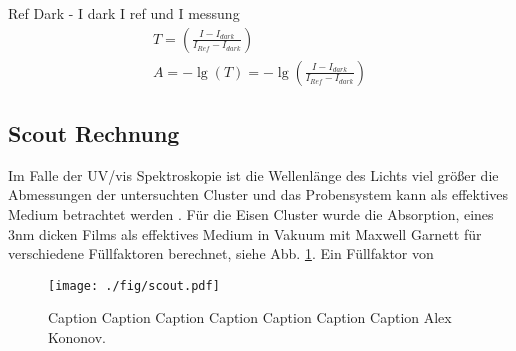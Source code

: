 Ref Dark - I dark I ref und I messung
\begin{align*}
    T=\left(\frac{I-I_{dark}}{I_{Ref}-I_{dark}}\right)\\
    A=- \lg\left(T\right) = -\lg\left(\frac{I-I_{dark}}{I_{Ref}-I_{dark}}\right)
\end{align*}

\subsection{Scout Rechnung}
\label{sec:scoutsim}
Im Falle der UV/vis Spektroskopie ist die Wellenlänge des Lichts viel größer die Abmessungen der untersuchten Cluster und das Probensystem kann als effektives Medium betrachtet werden \cite[S. 149 ff.]{Thei.1993}.  
Für die Eisen Cluster wurde die Absorption, eines 3nm dicken Films als effektives Medium in Vakuum mit Maxwell Garnett für verschiedene Füllfaktoren berechnet, siehe Abb. \ref{fig:scout}.
Ein Füllfaktor von 
\begin{figure}[h]
    \centering
    \texttt{[image: ./fig/scout.pdf]}
    \caption{Caption Caption Caption Caption Caption Caption Caption Alex Kononov.}
    \label{fig:scout}
\end{figure}


